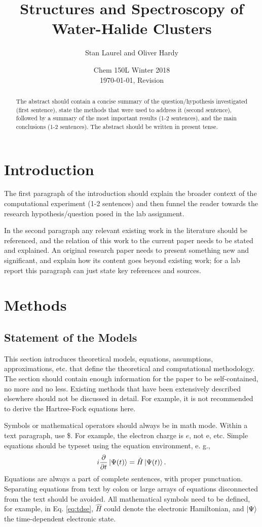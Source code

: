 \documentclass[11pt]{article}
\title{\textbf{Structures and Spectroscopy of Water-Halide Clusters}}
\author{Stan Laurel and Oliver Hardy}
\date{Chem 150L Winter 2018 \\ \today, Revision \Revision}
\begin{document}
\maketitle

\begin{abstract}
  \noindent The abstract should contain a concise summary of the
  question/hypothesis investigated (first sentence), state the methods
  that were used to address it (second sentence), followed by a summary
  of the most important results (1-2 sentences), and the main
  conclusions (1-2 sentences). The abstract should be written in present
  tense.
\end{abstract}

\section{Introduction}

The first paragraph of the introduction should explain the broader
context of the computational experiment (1-2 sentences) and then
funnel the reader towards the research hypothesis/question posed in the
lab assignment.

In the second paragraph any relevant existing work in the literature should
be referenced, and the relation of this work to the current paper needs
to be stated and explained. An original research paper needs to present
something new and significant, and explain how its content goes beyond
existing work; for a lab report this paragraph can just state key
references and sources.

\section{Methods}

\subsection{Statement of the Models}

This section introduces theoretical models, equations, assumptions,
approximations, etc. that define the theoretical and computational
methodology. The section should contain enough information for the paper
to be self-contained, no more and no less. Existing methods
that have been extensively described elsewhere should not be discussed
in detail. For example, it is not recommended to derive the Hartree-Fock
equations here.

Symbols or mathematical operators should always be in math mode. Within
a text paragraph, use \$. For example, the electron charge is $e$, not
e, etc. Simple equations should be typeset using the equation
environment, e. g.,
\begin{equation}
  \label{eq:tdse}
  i \frac{ \partial}{\partial t} \ket{\Psi(t)} = \hat{H} \ket{\Psi(t)}.
\end{equation}
Equations are always a part of complete sentences, with proper
punctuation. Separating equations from text by colon or large arrays of
equations disconnected from the text should be avoided. All mathematical
symbols need to be defined, for example, in Eq. \eqref{eq:tdse},
$\hat{H}$ could denote the electronic Hamiltonian, and $\ket{\Psi}$ the
time-dependent electronic state.
\end{document}

